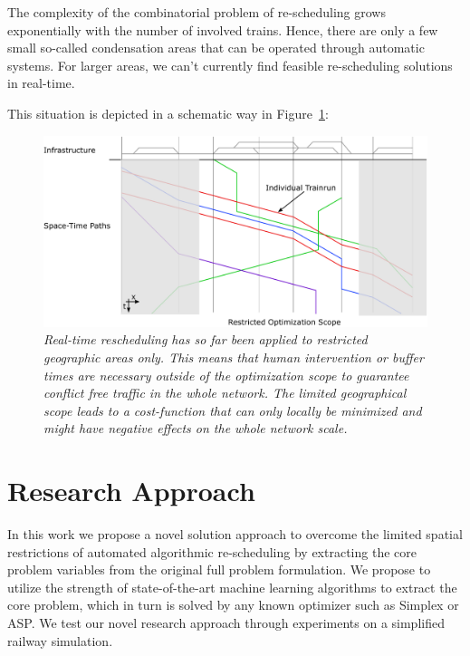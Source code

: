 \documentclass{article}
\begin{document}
 The complexity of the combinatorial problem of re-scheduling grows exponentially with the number of involved trains. Hence, there are only a few small so-called condensation areas \cite{caimi2009} that can be operated through automatic systems. For larger areas, we can't currently find feasible re-scheduling solutions in real-time.


This situation is depicted in a schematic way in Figure~\ref{fig:introduction_compensation}:
%
\begin{figure}[hbtp]
	\centering
  \includegraphics[width=\textwidth]{Figures/rsp_rescheduling_heute.pdf}
	\caption{\textit{Real-time rescheduling has so far been applied to restricted geographic areas only. This means that human intervention or buffer times are necessary outside of the optimization scope to guarantee conflict free traffic in the whole network. The limited geographical scope leads to a cost-function that can only locally be minimized and might have negative effects on the whole network scale.} }
	\label{fig:introduction_compensation}
\end{figure}




\section{Research Approach}\label{sec:researchapproach}
In this work we propose a novel solution approach to overcome the limited spatial restrictions of automated algorithmic re-scheduling by extracting the core problem variables from the original full problem formulation. We propose to utilize the strength of state-of-the-art machine learning algorithms to extract the core problem, which in turn is solved by any known optimizer such as Simplex or ASP. We test our novel research approach through experiments on a simplified railway simulation.
\end{document}
